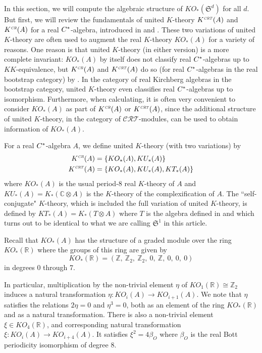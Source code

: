 \documentclass[12pt, reqno]{amsart}
\theoremstyle{definition}
\def\R{{\mathbb R}}
\def\C{{\mathbb C}}
\def\Z{{\mathbb Z}}
\def\so{_{\scriptscriptstyle O}}
\def\crr{^{\scriptscriptstyle {\it CR}}}
\def\crt{^{\scriptscriptstyle {\it CRT}}}
\newcommand{\fS}{\mathfrak S}
\begin{document}
In this section, we will compute the algebraic structure of $KO_*(\fS^d)$ for all $d$. But first, we will review the fundamentals of united $K$-theory $K\crt(A)$ and $K\crr(A)$ for a real $C \sp *$-algebra, introduced in \cite{Boer2002} and \cite{bousfield90}.
These two variations of united $K$-theory are often used to augment the real $K$-theory $KO_*(A)$ for a variety of reasons. One reason is that united $K$-theory (in either version) is a more complete invariant: $KO_*(A)$ by itself does not classify real $C \sp *$-algebras up to $KK$-equivalence, but $K\crr(A)$ and $K\crt(A)$ do so (for real $C \sp *$-algebras in the real bootstrap category) by \cite{Boer2004}. In the category of real Kirchberg algebras in the bootstrap category, united $K$-theory even classifies real $C \sp *$-algebras up to isomorphism.
Furthermore, when calculating, it is often very convenient to consider $KO_*(A)$ as part of $K\crr(A)$ or $K\crt(A)$, since the additional structure of united $K$-theory, in the category of $\mathcal{CRT}$-modules, can be used to obtain information of $KO_*(A)$.

For a real $C\sp*$-algebra $A$, we define united $K$-theory (with two variations) by
\begin{align*}
	K\crr(A) &= \{ KO_*(A), KU_*(A) \} \\
	K\crt(A) &= \{ KO_*(A), KU_*(A), KT_*(A) \}
\end{align*}
where $KO_*(A)$ is the usual period-8 real $K$-theory of $A$ and $KU_*(A) = K_*(\C \otimes A)$ is the $K$-theory of the complexification of $A$. 
The ``self-conjugate" $K$-theory, which is included the full variation of united $K$-theory, is defined by $KT_*(A) = K_*(T \otimes A)$ where $T$ is the algebra defined in \cite{Boer2002} and which turns out to be identical to what we are calling $\fS^1$ in this article.

Recall that $KO_*(A)$ has the structure of a graded module over the ring $KO_*(\R)$ where the groups of this ring are given by
\[ KO_*(\R) = (\Z , ~\Z_2 ,~ \Z_2 ,~ 0  ,~ \Z  ,~ 0  ,~ 0  ,~ 0)  \]
in degrees 0 through 7. 

In particular, 
multiplication by the non-trivial element $\eta$ of $KO_1(\R) \cong \Z_2$
 induces a natural transformation
$\eta \colon KO_i(A) \rightarrow KO_{i+1}(A) .$
We note that $\eta$ satisfies the relations $2 \eta = 0$ and $\eta^3 = 0$, both as an element of the ring $KO_*(\R)$ and as a natural transformation. There is also a non-trivial element $\xi \in KO_4(\R)$, and corresponding natural transformation
$\xi \colon KO_i(A) \rightarrow KO_{i+4}(A)$. It satisfies $\xi^2 = 4 \beta\so$ where $\beta\so$ is the real Bott periodicity isomorphism of degree 8.
\end{document}
